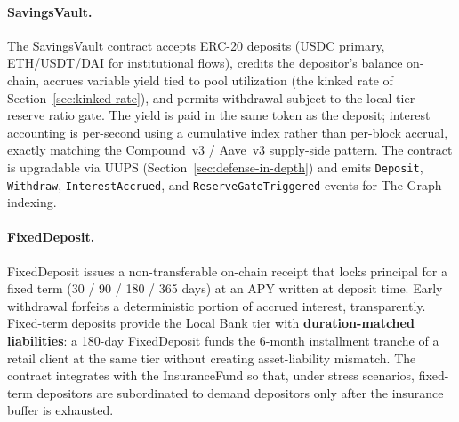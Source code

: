 \documentclass[12pt,a4paper]{report}
\begin{document}
\paragraph{SavingsVault.}
The SavingsVault contract accepts ERC-20 deposits (USDC primary, ETH/USDT/DAI for institutional flows), credits the depositor's balance on-chain, accrues variable yield tied to pool utilization (the kinked rate of Section~\ref{sec:kinked-rate}), and permits withdrawal subject to the local-tier reserve ratio gate. The yield is paid in the same token as the deposit; interest accounting is per-second using a cumulative index rather than per-block accrual, exactly matching the Compound~v3 / Aave~v3 supply-side pattern. The contract is upgradable via UUPS (Section~\ref{sec:defense-in-depth}) and emits \texttt{Deposit}, \texttt{Withdraw}, \texttt{InterestAccrued}, and \texttt{ReserveGateTriggered} events for The Graph indexing.

\paragraph{FixedDeposit.}
FixedDeposit issues a non-transferable on-chain receipt that locks principal for a fixed term (30 / 90 / 180 / 365 days) at an APY written at deposit time. Early withdrawal forfeits a deterministic portion of accrued interest, transparently. Fixed-term deposits provide the Local Bank tier with \textbf{duration-matched liabilities}: a 180-day FixedDeposit funds the 6-month installment tranche of a retail client at the same tier without creating asset-liability mismatch. The contract integrates with the InsuranceFund so that, under stress scenarios, fixed-term depositors are subordinated to demand depositors only after the insurance buffer is exhausted.
\end{document}
